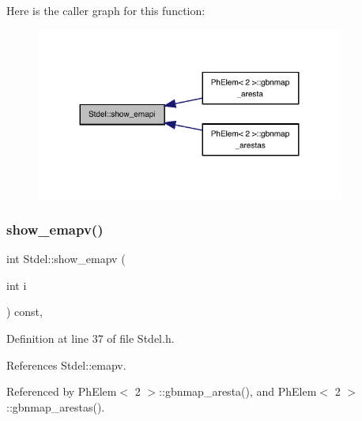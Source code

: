 Here is the caller graph for this function\+:
\nopagebreak
\begin{figure}[H]
\begin{center}
\leavevmode
\includegraphics[width=287pt]{classStdel_aca7fb885191a952c013e930521a42213_icgraph}
\end{center}
\end{figure}
\mbox{\label{classStdel_ad474ffc52b051ae8317b3fdb583c4c98}} 
\subsubsection{\texorpdfstring{show\+\_\+emapv()}{show\_emapv()}}
{\footnotesize\ttfamily int Stdel\+::show\+\_\+emapv (\begin{DoxyParamCaption}\item[{int}]{i }\end{DoxyParamCaption}) const\hspace{0.3cm}{\ttfamily [inline]}, {\ttfamily [inherited]}}



Definition at line 37 of file Stdel.\+h.



References Stdel\+::emapv.



Referenced by Ph\+Elem$<$ 2 $>$\+::gbnmap\+\_\+aresta(), and Ph\+Elem$<$ 2 $>$\+::gbnmap\+\_\+arestas().

